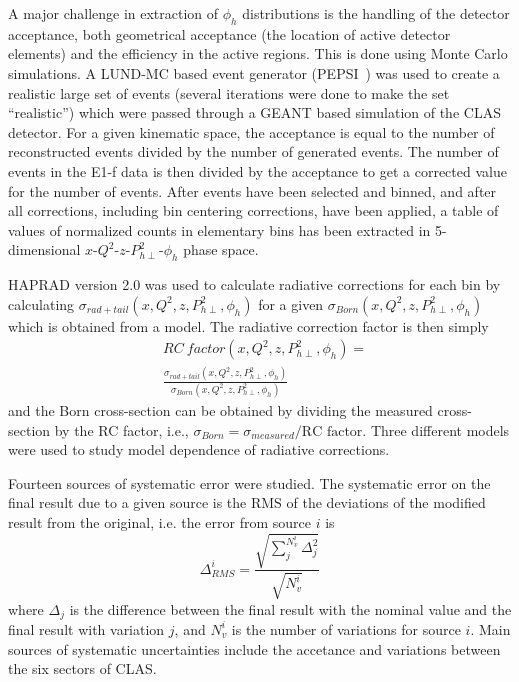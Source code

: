 \documentclass[aps,prl,twocolumn,showpacs,superscriptaddress,groupedaddress]{revtex4-1}  %
\newcommand{\Phperp}{P_{h\perp}}
\begin{document}
A major challenge in extraction of $\phi_h$ distributions is the handling of the detector acceptance, both geometrical acceptance (the location of active detector elements) and the efficiency in the active regions.
This is done using Monte Carlo simulations.
A LUND-MC based event generator (PEPSI~\cite{Mankiewicz:1991dp}) was used to create a realistic large set of events (several iterations were done to make the set ``realistic'') which were passed through a GEANT based simulation of the CLAS detector.
For a given kinematic space, the acceptance is equal to the number of reconstructed events divided by the number of generated events.
The number of events in the E1-f data is then divided by the acceptance to get a corrected value for the number of events.
After events have been selected and binned, and after all corrections, including bin centering corrections,  have been applied, 
a table of values of normalized counts in elementary bins has been extracted in 5-dimensional $x$-$Q^2$-$z$-$\Phperp^2$-$\phi_h$ phase space.

HAPRAD version 2.0 \cite{Akushevich:1999hz,Akushevich:2007jc} was used to calculate radiative corrections for each bin by calculating $\sigma_{rad+tail} \left( x, Q^2, z, P_{h\perp}^2, \phi_h \right)$ for a given \allowbreak $\sigma_{Born} \left( x, Q^2, z, P_{h\perp}^2, \phi_h \right)$ which is obtained from a model.
The radiative correction factor is then simply
\begin{equation}
\begin{split}
\label{eq:RCfactor}
& RC\ factor \left( x, Q^2, z, P_{h\perp}^2, \phi_h \right) =
\\
& \frac{\sigma_{rad+tail} \left( x, Q^2, z, P_{h\perp}^2, \phi_h \right)}{\sigma_{Born} \left( x, Q^2, z, P_{h\perp}^2, \phi_h \right)}
\end{split}
\end{equation}
and the Born cross-section can be obtained by dividing the measured cross-section by the RC factor, i.e., $\sigma_{Born} = \sigma_{measured}/\text{RC factor}$.
Three different models were used to study model dependence of radiative corrections.

Fourteen sources of systematic error were studied.
The systematic error on the final result due to a given source is the RMS of the deviations of the modified result from the original, i.e. the error from source $i$ is
%
\begin{equation}
\label{eq:RMS}
\Delta_{RMS}^i = \frac{\sqrt{\sum_j^{N_v^i} \Delta_j^2}}{\sqrt{N_v^i}}
\end{equation}
%
where $\Delta_j$ is the difference between the final result with the nominal value and the final result with variation $j$, and $N_v^i$ is the number of variations for source $i$.
Main sources of systematic uncertainties include the accetance and variations between the six sectors of CLAS.
\end{document}
